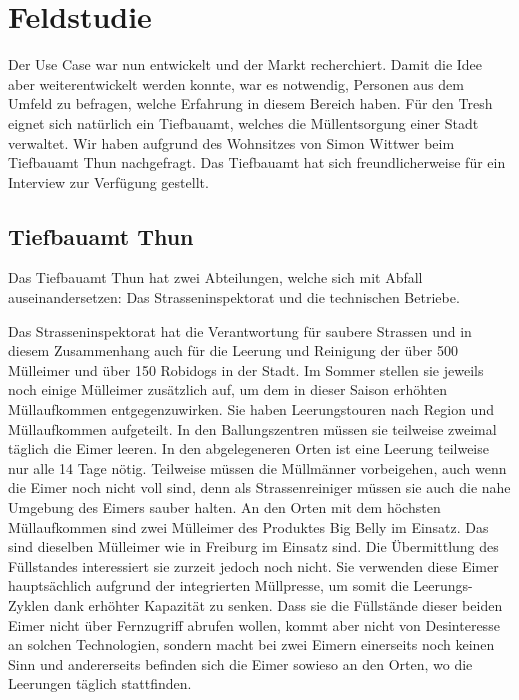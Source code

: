 \section{Feldstudie}
Der Use Case war nun entwickelt und der Markt recherchiert. Damit die Idee aber weiterentwickelt werden konnte, war es notwendig, Personen aus dem Umfeld zu befragen, welche Erfahrung in diesem Bereich haben. Für den Tresh eignet sich natürlich ein Tiefbauamt, welches die Müllentsorgung einer Stadt verwaltet. Wir haben aufgrund des Wohnsitzes von Simon Wittwer beim Tiefbauamt Thun nachgefragt. Das Tiefbauamt hat sich freundlicherweise für ein Interview zur Verfügung gestellt.

\subsection{Tiefbauamt Thun}
Das Tiefbauamt Thun hat zwei Abteilungen, welche sich mit Abfall auseinandersetzen: Das Strasseninspektorat und die technischen Betriebe.

Das Strasseninspektorat hat die Verantwortung für saubere Strassen und in diesem Zusammenhang auch für die Leerung und Reinigung der über 500 Mülleimer und über 150 \glqq{}Robidogs\grqq{} in der Stadt. Im Sommer stellen sie jeweils noch einige Mülleimer zusätzlich auf, um dem in dieser Saison erhöhten Müllaufkommen entgegenzuwirken. Sie haben Leerungstouren nach Region und Müllaufkommen aufgeteilt. In den Ballungszentren müssen sie teilweise zweimal täglich die Eimer leeren. In den abgelegeneren Orten ist eine Leerung teilweise nur alle 14 Tage nötig. Teilweise müssen die Müllmänner vorbeigehen, auch wenn die Eimer noch nicht voll sind, denn als Strassenreiniger müssen sie auch die nahe Umgebung des Eimers sauber halten. An den Orten mit dem höchsten Müllaufkommen sind zwei Mülleimer des Produktes \glqq{}Big Belly\grqq{} im Einsatz. Das sind dieselben Mülleimer wie in Freiburg im Einsatz sind. Die Übermittlung des Füllstandes interessiert sie zurzeit jedoch noch nicht. Sie verwenden diese Eimer hauptsächlich aufgrund der integrierten Müllpresse, um somit die Leerungs-Zyklen dank erhöhter Kapazität zu senken. Dass sie die Füllstände dieser beiden Eimer nicht über Fernzugriff abrufen wollen, kommt aber nicht von Desinteresse an solchen Technologien, sondern macht bei zwei Eimern einerseits noch keinen Sinn und andererseits befinden sich die Eimer sowieso an den Orten, wo die Leerungen täglich stattfinden.

